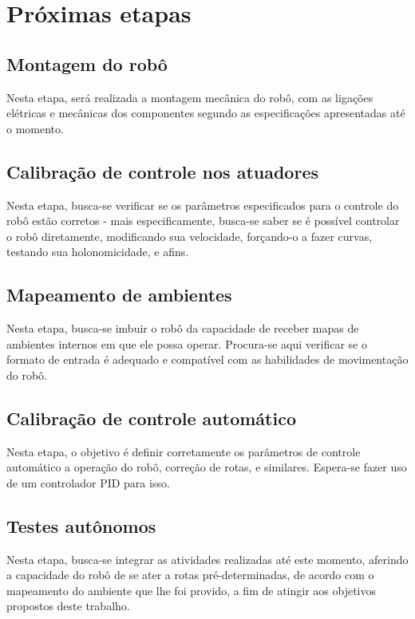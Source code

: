 

\chapter{Próximas etapas}

\section{Montagem do robô}
Nesta etapa, será realizada a montagem mecânica do robô, com as ligações
elétricas e mecânicas dos componentes segundo as especificações apresentadas
até o momento.

\section{Calibração de controle nos atuadores}
Nesta etapa, busca-se verificar se os parâmetros especificados para o controle
do robô estão corretos - mais especificamente, busca-se saber se é possível
controlar o robô diretamente, modificando sua velocidade, forçando-o a fazer
curvas, testando sua holonomicidade, e afins.

\section{Mapeamento de ambientes}
Nesta etapa, busca-se imbuir o robô da capacidade de receber mapas de ambientes
internos em que ele possa operar. Procura-se aqui verificar se o formato de
entrada é adequado e compatível com as habilidades de movimentação do robô.

\section{Calibração de controle automático}
Nesta etapa, o objetivo é definir corretamente os parâmetros de controle
automático a operação do robô, correção de rotas, e similares. Espera-se fazer
uso de um controlador PID para isso.

\section{Testes autônomos}
Nesta etapa, busca-se integrar as atividades realizadas até este momento,
aferindo a capacidade do robô de se ater a rotas pré-determinadas, de acordo com
o mapeamento do ambiente que lhe foi provido, a fim de atingir aos objetivos 
propostos deste trabalho.